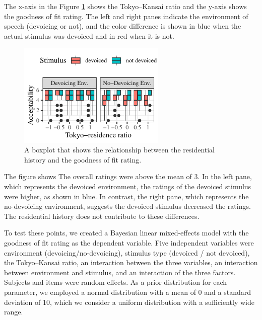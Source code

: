 \documentclass[a4paper,11pt,twocolumn]{article}
\begin{document}
The x-axis in the Figure \ref{fig:cat_results} shows the Tokyo--Kansai ratio and the y-axis shows the goodness of fit rating. The left and right panes indicate the environment of speech (devoicing or not), and the color difference is shown in blue when the actual stimulus was devoiced and in red when it is not.

\begin{figure}[!ht]
\begin{center}
\includegraphics[width=7cm]{../results/artifact/results_categorization.pdf}
\caption{A boxplot that shows the relationship between the residential history and the goodness of fit rating.}\label{fig:cat_results}
\end{center}
\end{figure}

The figure shows The overall ratings were above the mean of 3. In the left pane, which represents the devoiced environment, the ratings of the devoiced stimulus were higher, as shown in blue. In contrast, the right pane, which represents the no-devoicing environment, suggests the devoiced stimulus decreased the ratings. The residential history does not contribute to these differences.

To test these points, we created a Bayesian linear mixed-effects model with the goodness of fit rating as the dependent variable. Five independent variables were environment (devoicing/no-devoicing), stimulus type (devoiced / not devoiced), the Tokyo--Kansai ratio, an interaction between the three variables, an interaction between environment and stimulus, and an interaction of the three factors. Subjects and items were random effects. As a prior distribution for each parameter, we employed a normal distribution with a mean of 0 and a standard deviation of 10, which we consider a uniform distribution with a sufficiently wide range.

\end{document}
